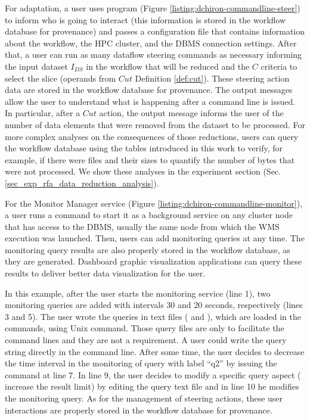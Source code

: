 For adaptation, a user uses  program (Figure \ref{listing:dchiron-commandline-steer}) to inform  who is going to
interact (this information
is stored in the workflow database for provenance) and passes a configuration
file that contains information about the workflow, the HPC cluster, and
the DBMS connection settings. After that, a user can run as many
dataflow steering commands as necessary informing the input dataset
$I_{DS}$ in the workflow that will be reduced and the $C$ criteria
to select the slice (operands from $Cut$ Definition \ref{def:cut}).
These steering action data are stored in the workflow database for provenance. The
output messages allow the user to understand what is
happening after a command line is issued. In particular, after a
$Cut$ action, the output message informs the user of the
number of data elements that were removed from the dataset to be
processed. For more complex analyses on the consequences of those
reductions, users can query the workflow database using the tables introduced
in this work to verify, for example, if there were files and their sizes
to quantify the number of bytes that were not processed.
We show these analyses in the experiment section (Sec. \ref{sec_exp_rfa_data_reduction_analysis}).



For the Monitor Manager service (Figure \ref{listing:dchiron-commandline-monitor}), a user runs a command to start it
 as a background service on any cluster node that has
access to the DBMS, usually the same node from which the WMS execution
was launched. Then, users can add monitoring queries at any time. The
monitoring query results are also properly stored in the workflow database, as
they are generated. Dashboard graphic visualization applications can
query these results to deliver better data visualization for the user.






In this example, after the user starts the monitoring service (line 1),
two monitoring queries are added with intervals 30 and 20 seconds,
respectively (lines 3 and 5). The user wrote the queries in text files
( and ), which are loaded in the
 commands,
using  Unix command. Those query files are only to facilitate the
command lines and they are not a requirement. A user could write the
query string directly in the command line. After some time, the user decides
to decrease the time interval in the monitoring of query with label
``q2'' by issuing the command at line 7. In line 9, the user decides to modify a
specific query aspect (\eg{} increase the result limit) by
editing the query text file and in line 10 he modifies the monitoring
query. As for the management of steering actions, these user interactions are properly stored in the workflow database for
provenance.
